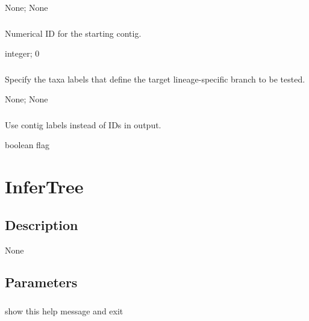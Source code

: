 \documentclass[letterpaper,11pt,english]{sphinxmanual}
\begin{document}
 None;  None


\subsubsection{}
\label{\detokenize{prog_desc:start-contig-startcontig}}
 Numerical ID for the starting contig.

 integer;  0


\subsubsection{}
\label{\detokenize{prog_desc:target}}
 Specify the taxa labels that define the target lineage-specific branch to be tested.

 None;  None


\subsubsection{}
\label{\detokenize{prog_desc:use-labels-uselabels}}
 Use contig labels instead of IDs in output.

 boolean flag


\section{InferTree}
\label{\detokenize{prog_desc:infertree}}

\subsection{Description}
\label{\detokenize{prog_desc:id105}}
None


\subsection{Parameters}
\label{\detokenize{prog_desc:id106}}

\subsubsection{}
\label{\detokenize{prog_desc:id107}}
 show this help message and exit
\end{document}
